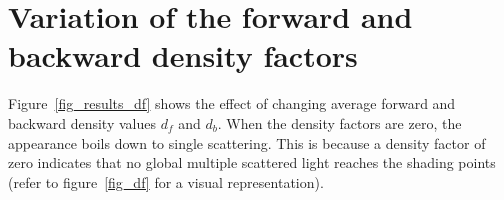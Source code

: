 \documentclass[11pt,a4paper]{report}
\begin{document}
\section{Variation of the forward and backward density factors}

Figure~\ref{fig_results_df} shows the effect of changing average forward and backward density values $d_f$ and $d_b$. When the density factors are zero, the appearance boils down to single scattering. This is because a density factor of zero indicates that no global multiple scattered light reaches the shading points (refer to figure~\ref{fig_df} for a visual representation).



\begin{figure}[h]
\bgroup
\setlength{\tabcolsep}{0.0em} %
\def\arraystretch{0.0}%
\begin{tabular}{cccc}

\end{tabular}
\end{figure}
\end{document}
